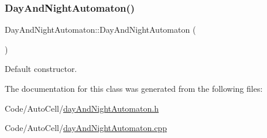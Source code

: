 \subsubsection{\texorpdfstring{Day\+And\+Night\+Automaton()}{DayAndNightAutomaton()}}
{\footnotesize\ttfamily Day\+And\+Night\+Automaton\+::\+Day\+And\+Night\+Automaton (\begin{DoxyParamCaption}{ }\end{DoxyParamCaption})\hspace{0.3cm}{\ttfamily [inline]}}

Default constructor. 

The documentation for this class was generated from the following files\+:\begin{DoxyCompactItemize}
\item 
Code/\+Auto\+Cell/\mbox{\hyperlink{day_and_night_automaton_8h}{day\+And\+Night\+Automaton.\+h}}\item 
Code/\+Auto\+Cell/\mbox{\hyperlink{day_and_night_automaton_8cpp}{day\+And\+Night\+Automaton.\+cpp}}\end{DoxyCompactItemize}
